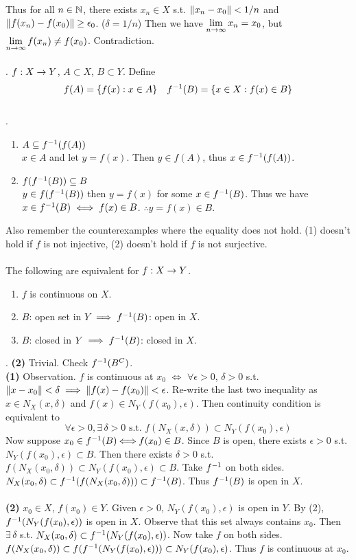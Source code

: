 Thus for all $n\in \mathbb{N}$, there exists $x_n\in X$ s.t. $\left\lVert x_n - x_0\right\rVert < 1/n$ and $\left\lVert f(x_n)-f(x_0)\right\rVert \geq \epsilon_0$. ($\delta = 1/n$) Then we have $\displaystyle\lim_{n\rightarrow\infty} x_n = x_0$, but $\displaystyle \lim_{n\rightarrow\infty} f(x_n) \neq f(x_0)$. Contradiction.\\
\\
. $f:X\rightarrow Y$, $A\subset X$, $B\subset Y$. Define $$f(A) = \{f(x): x\in A\} \quad f^{-1} (B)=\{x\in X: f(x)\in B \}$$
\\
\rmk.
\begin{enumerate}
	\item $A \subseteq f^{-1}(f(A))$\\
	$x \in A$ and let $y  =f(x)$. Then $y\in f(A)$, thus $x\in f^{-1}(f(A))$.
	\item $f(f^{-1}(B)) \subseteq B$\\
	$y\in f(f^{-1}(B))$ then $y = f(x)$ for some $x\in f^{-1}(B)$. Thus we have $x\in f^{-1}(B) \iff f(x)\in B$. $\therefore y = f(x)\in B$.
\end{enumerate}
Also remember the counterexamples where the equality does not hold. (1) doesn't hold if $f$ is not injective, (2) doesn't hold if $f$ is not surjective.\\
\\
 The following are equivalent for $f:X\rightarrow Y$.
\begin{enumerate}
	\item $f$ is continuous on $X$.
	\item $B$: open set in $Y$ $\implies f^{-1}(B)$: open in $X$.
	\item $B$: closed in $Y \implies f^{-1}(B)$: closed in $X$.
\end{enumerate}
\pf. \textbf{(2)} Trivial. Check $f^{-1}(B^C)$.\\
\textbf{(1)} Observation. $f$ is continuous at $x_0$ $\iff$ $\forall \epsilon>0$, $\delta > 0$ s.t. $\left\lVert x-x_0\right\rVert < \delta \implies \left\lVert f(x)-f(x_0)\right\rVert < \epsilon$. Re-write the last two inequality as $x\in N_X(x, \delta)$ and $f(x)\in N_Y(f(x_0), \epsilon)$. Then continuity condition is equivalent to $$\forall \epsilon>0, \exists\,\delta > 0 \text{ s.t. } f(N_X(x, \delta)) \subset N_Y(f(x_0), \epsilon)$$  
Now suppose $x_0\in f^{-1}(B)\!\!\iff\!\! f(x_0) \in B$. Since $B$ is open, there exists $\epsilon>0$ s.t. $N_Y(f(x_0),\epsilon)\subset B$. Then there exists $\delta>0$ s.t. $f(N_X(x_0, \delta)) \subset N_Y(f(x_0), \epsilon) \subset B$. Take $f^{-1}$ on both sides. $N_X(x_0, \delta)\subset f^{-1}(f(N_X(x_0, \delta))) \subset f^{-1} (B)$. Thus $f^{-1} (B)$ is open in $X$.\\
\\
\textbf{(2)} $x_0\in X$, $f(x_0)\in Y$. Given $\epsilon>0$, $N_Y(f(x_0), \epsilon)$ is open in $Y$. By (2), $f^{-1}(N_Y(f(x_0), \epsilon))$ is open in $X$. Observe that this set always contains $x_0$. Then  $\exists\,\delta$ s.t. $N_X(x_0, \delta) \subset f^{-1}(N_Y(f(x_0), \epsilon))$. Now take $f$ on both sides. $f(N_X(x_0, \delta)) \subset f(f^{-1}(N_Y(f(x_0), \epsilon))) \subset N_Y(f(x_0), \epsilon)$. Thus $f$ is continuous at $x_0$.





\pagebreak